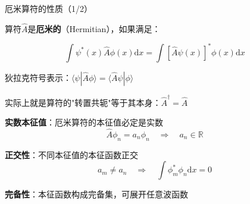 
\begin{frame}{厄米算符的性质（1/2）}
  
    \begin{iqbitemize}
    \item 算符$\hat{A}$是\textbf{厄米的}（Hermitian），如果满足：
    \end{iqbitemize}
      \[
        \int \psi^*(x)\hat{A}\phi(x)\mathrm{d}x = \int [\hat{A}\psi(x)]^*\phi(x)\mathrm{d}x
      \]
    \begin{iqbitemize}
    \item 狄拉克符号表示：$\langle\psi|\hat{A}\phi\rangle = \langle\hat{A}\psi|\phi\rangle$
    \item 实际上就是算符的"转置共轭"等于其本身：$\hat{A}^\dagger = \hat{A}$
    \end{iqbitemize}
    \iqbsmallsep

    \begin{iqbitemize}
    \item \textbf{实数本征值}：厄米算符的本征值必定是实数
    \[
      \hat{A}\phi_n = a_n\phi_n \quad \Rightarrow \quad a_n \in \mathbb{R}
    \]
    \item \textbf{正交性}：不同本征值的本征函数正交
    \[
      a_m \neq a_n \quad \Rightarrow \quad \int \phi_m^*\phi_n\mathrm{d}x = 0
    \]
    \item \textbf{完备性}：本征函数构成完备集，可展开任意波函数
    \end{iqbitemize}
  
\end{frame}

